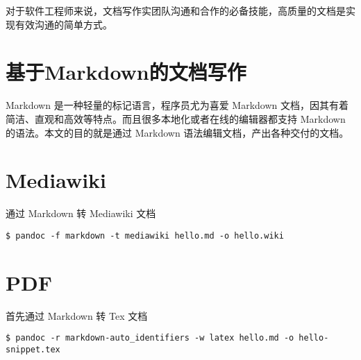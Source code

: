 对于软件工程师来说，文档写作实团队沟通和合作的必备技能，高质量的文档是实现有效沟通的简单方式。

\section{基于Markdown的文档写作}

Markdown 是一种轻量的标记语言，程序员尤为喜爱 Markdown
文档，因其有着简洁、直观和高效等特点。而且很多本地化或者在线的编辑器都支持
Markdown 的语法。本文的目的就是通过 Markdown
语法编辑文档，产出各种交付的文档。

\section{Mediawiki}

通过 Markdown 转 Mediawiki 文档

\begin{verbatim}
$ pandoc -f markdown -t mediawiki hello.md -o hello.wiki
\end{verbatim}

\section{PDF}

首先通过 Markdown 转 Tex 文档

\begin{verbatim}
$ pandoc -r markdown-auto_identifiers -w latex hello.md -o hello-snippet.tex
\end{verbatim}
